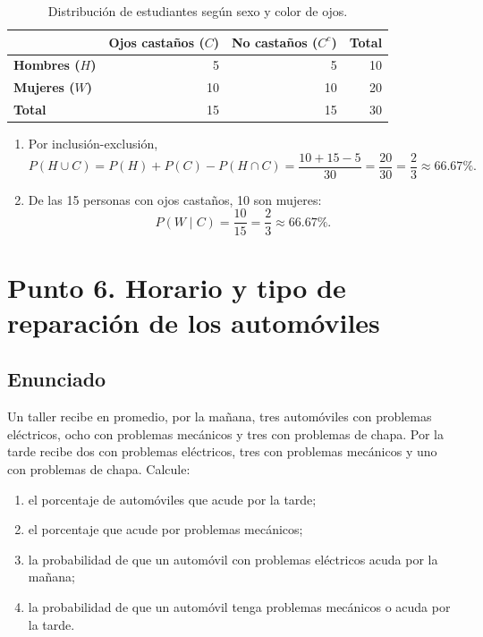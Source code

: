 \documentclass[12pt]{article}
\begin{document}
\begin{table}[H]
\centering
\small
\renewcommand{\arraystretch}{1.15}
\begin{tabular}{|l|r|r|r|}
\hline
 & \textbf{Ojos castaños ($C$)} & \textbf{No castaños ($C^c$)} & \textbf{Total} \\ \hline
\textbf{Hombres ($H$)} & 5 & 5 & 10 \\ \hline
\textbf{Mujeres ($W$)} & 10 & 10 & 20 \\ \hline
\textbf{Total} & 15 & 15 & 30 \\ \hline
\end{tabular}
\caption{Distribución de estudiantes según sexo y color de ojos.}
\label{tab:ojos-castanos}
\end{table}

\begin{enumerate}
    \item Por inclusión-exclusión,
    \[
    P(H\cup C)=P(H)+P(C)-P(H\cap C)
    =\frac{10+15-5}{30}=\frac{20}{30}=\frac{2}{3}\approx66.67\%.
    \]
    \item De las 15 personas con ojos castaños, 10 son mujeres:
    \[
    P(W\mid C)=\frac{10}{15}=\frac{2}{3}\approx66.67\%.
    \]
\end{enumerate}

\section*{Punto 6. Horario y tipo de reparación de los automóviles}

\subsection*{Enunciado}

Un taller recibe en promedio, por la mañana, tres automóviles con problemas eléctricos, ocho con problemas mecánicos y tres con problemas de chapa. Por la tarde recibe dos con problemas eléctricos, tres con problemas mecánicos y uno con problemas de chapa. Calcule:

\begin{enumerate}
    \item el porcentaje de automóviles que acude por la tarde;
    \item el porcentaje que acude por problemas mecánicos;
    \item la probabilidad de que un automóvil con problemas eléctricos acuda por la mañana;
    \item la probabilidad de que un automóvil tenga problemas mecánicos o acuda por la tarde.
\end{enumerate}
\end{document}
